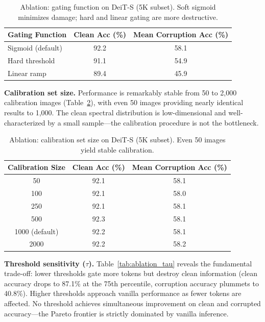 \documentclass{article}
\begin{document}
\begin{table}[t]
\centering
\caption{Ablation: gating function on DeiT-S (5K subset). Soft sigmoid minimizes damage; hard and linear gating are more destructive.}
\label{tab:ablation_gating}
\begin{tabular}{lcc}
\toprule
Gating Function & Clean Acc (\%) & Mean Corruption Acc (\%) \\
\midrule
Sigmoid (default) & 92.2 & 58.1 \\
Hard threshold & 91.1 & 54.9 \\
Linear ramp & 89.4 & 45.9 \\
\bottomrule
\end{tabular}
\end{table}

\textbf{Calibration set size.} Performance is remarkably stable from 50 to 2,000 calibration images (Table~\ref{tab:ablation_cal}), with even 50 images providing nearly identical results to 1,000. The clean spectral distribution is low-dimensional and well-characterized by a small sample---the calibration procedure is not the bottleneck.

\begin{table}[t]
\centering
\caption{Ablation: calibration set size on DeiT-S (5K subset). Even 50 images yield stable calibration.}
\label{tab:ablation_cal}
\begin{tabular}{ccc}
\toprule
Calibration Size & Clean Acc (\%) & Mean Corruption Acc (\%) \\
\midrule
50 & 92.1 & 58.1 \\
100 & 92.1 & 58.0 \\
250 & 92.1 & 58.1 \\
500 & 92.3 & 58.1 \\
1000 (default) & 92.2 & 58.1 \\
2000 & 92.2 & 58.2 \\
\bottomrule
\end{tabular}
\end{table}

\textbf{Threshold sensitivity ($\tau$).} Table~\ref{tab:ablation_tau} reveals the fundamental trade-off: lower thresholds gate more tokens but destroy clean information (clean accuracy drops to 87.1\% at the 75th percentile, corruption accuracy plummets to 40.8\%). Higher thresholds approach vanilla performance as fewer tokens are affected. No threshold achieves simultaneous improvement on clean and corrupted accuracy---the Pareto frontier is strictly dominated by vanilla inference.
\end{document}
